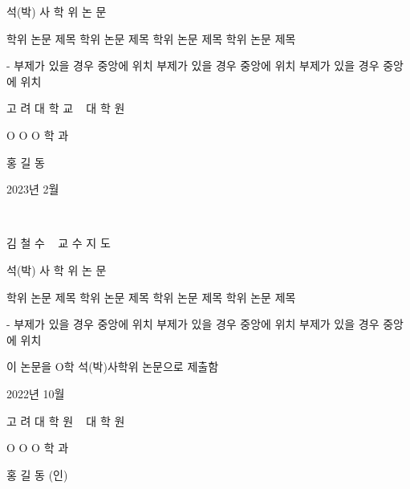 \documentclass[11pt]{report}
\begin{document}
\newpage
\centering
{} %
\Large 석(박) 사 학 위 논 문
\par\vspace{3cm} %
\huge 학위 논문 제목  학위 논문 제목   학위 논문 제목  학위 논문 제목 
\par\vspace{0.3cm}\Large - 부제가 있을 경우 중앙에 위치 부제가 있을 경우 중앙에 위치 부제가 있을 경우 중앙에 위치
\par\vspace{4.5cm} %
\LARGE 고 려 대 학 교 ~ 대 학 원
\par\vspace{0.5cm}
\Large O O O 학 과
\par\vspace{0.5cm}
\Large 홍 길 동
\par\vspace{3cm}
\large 2023년 2월 %

\newpage
~

\newpage
\Large 김 철 수 ~ 교 수 지 도
\par\vspace{0.5cm}
\Large 석(박) 사 학 위 논 문
\par\vspace{2cm}
\huge 학위 논문 제목 학위 논문 제목 학위 논문 제목 학위 논문 제목
\par\vspace{0.3cm}\Large - 부제가 있을 경우 중앙에 위치 부제가 있을 경우 중앙에 위치 부제가 있을 경우 중앙에 위치
\par\vspace{2cm} %
\Large 이 논문을 O학 석(박)사학위 논문으로 제출함
\par\vspace{2cm} %
\large 2022년 10월 %
\par\vspace{2cm} %
\LARGE 고 려 대 학 원 ~ 대 학 원
\par\vspace{0.5cm}
\Large O O O 학 과
\par\vspace{1cm}
\Large 홍 길 동 (인)
\end{document}
